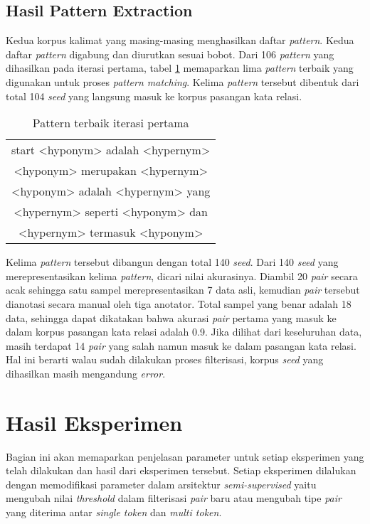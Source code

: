 \subsection{Hasil Pattern Extraction}
Kedua korpus kalimat yang masing-masing menghasilkan daftar \textit{pattern}. Kedua daftar \textit{pattern} digabung dan diurutkan sesuai bobot. Dari 106 \textit{pattern} yang dihasilkan pada iterasi pertama, tabel \ref{table:pattern1} memaparkan lima \textit{pattern} terbaik yang digunakan untuk proses \textit{pattern matching}. Kelima \textit{pattern} tersebut dibentuk dari total 104 \textit{seed} yang langsung masuk ke korpus pasangan kata relasi.

\begin{table}
  \centering
  \caption{Pattern terbaik iterasi pertama}
  \label{table:pattern1}
  \begin{tabular}{|c|}
    \hline
      start <hyponym> adalah <hypernym> \\
      <hyponym> merupakan <hypernym> \\ 
      <hyponym> adalah <hypernym> yang \\
      <hypernym> seperti <hyponym> dan \\
      <hypernym> termasuk <hyponym> \\ \hline
  \end{tabular}
\end{table}

Kelima \textit{pattern} tersebut dibangun dengan total 140 \textit{seed}. Dari 140 \textit{seed} yang merepresentasikan kelima \textit{pattern}, dicari nilai akurasinya. Diambil 20 \textit{pair} secara acak sehingga satu sampel merepresentasikan 7 data asli, kemudian \textit{pair} tersebut dianotasi secara manual oleh tiga anotator. Total sampel yang benar adalah 18 data, sehingga dapat dikatakan bahwa akurasi \textit{pair} pertama yang masuk ke dalam korpus pasangan kata relasi adalah 0.9. Jika dilihat dari keseluruhan data, masih terdapat 14 \textit{pair} yang salah namun masuk ke dalam pasangan kata relasi. Hal ini berarti walau sudah dilakukan proses filterisasi, korpus \textit{seed} yang dihasilkan masih mengandung \textit{error}. 

\section{Hasil Eksperimen}
Bagian ini akan memaparkan penjelasan parameter untuk setiap eksperimen yang telah dilakukan dan hasil dari eksperimen tersebut. Setiap eksperimen dilalukan dengan memodifikasi parameter dalam arsitektur \textit{semi-supervised} yaitu mengubah nilai \textit{threshold} dalam filterisasi \textit{pair} baru atau mengubah tipe \textit{pair} yang diterima antar \textit{single token} dan \textit{multi token}.

